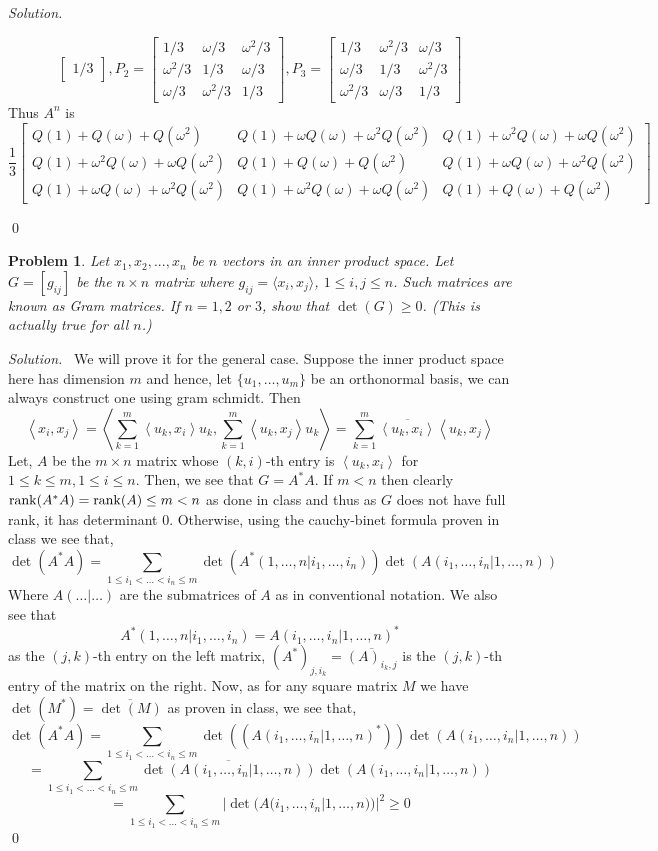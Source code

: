 \documentclass[12pt,a4paper]{article}
\newenvironment{solution}{%
  \par\noindent\textit{Solution.}\ }{\qed}
\theoremstyle{problemstyle}
\newtheorem{problem}{Problem}[section]
\def\w{\omega}
\newcommand{\ipp}[1]{{\left\langle{#1}\right\rangle}}
\begin{document}
\begin{solution}
\begin{enumerate}[\label=(\roman*)]
$$\begin{bmatrix}
1/3\end{bmatrix},P_2=\begin{bmatrix}1/3 & \w/3 & \w^2/3\\ \w^2/3 & 1/3 &
\w/3\\ \w/3 & \w^2/3 & 1/3\end{bmatrix}, P_3=\begin{bmatrix}1/3 & \omega^2/3 & \omega/3\\ \w/3 & 1/3 & \w^2/3\\ \w^2/3 & \w/3 & 1/3\end{bmatrix}$$
Thus $A^n$ is
$$
\frac{1}{3}
\begin{bmatrix}
Q(1) + Q(\w) + Q(\w^2) & Q(1) + \w Q(\w) + \w^2 Q(\w^2) & Q(1) + \w^2 Q(\w) + \w Q(\w^2) \\
Q(1) + \w^2 Q(\w) + \w Q(\w^2) & Q(1) + Q(\w) + Q(\w^2) & Q(1) + \w Q(\w) + \w^2 Q(\w^2) \\
Q(1) + \w Q(\w) + \w^2 Q(\w^2) & Q(1) + \w^2 Q(\w) + \w Q(\w^2) & Q(1) + Q(\w) + Q(\w^2)
\end{bmatrix}
$$
\end{enumerate}
\end{solution}
\begin{problem}\label{prob:2-4}
Let $x_{1},x_{2},...,x_{n}$ be $n$ vectors in an inner product space. Let $G=[g_{ij}]$ be the $n\times n$ matrix where $g_{ij}=\langle x_{i},x_{j}\rangle$, $1 \le i, j \le n$. Such matrices are known as Gram matrices. If $n=1, 2$ or $3$, show that $\det(G)\ge0$. (This is actually true for all $n$.)
\end{problem}
\begin{solution}
We will prove it for the general case. Suppose the inner product space here has dimension $m$ and hence, let $\{u_1,\ldots,u_m\}$ be an orthonormal basis, we can always construct one using gram schmidt. Then
$$\ipp{x_i,x_j}=\ipp{\sum_{k=1}^m\ipp{u_k,x_i}u_k,\sum_{k=1}^m\ipp{u_k,x_j}u_k}=\sum_{k=1}^m\overline{\ipp{u_k,x_i}}\ipp{u_k,x_j}$$
Let, $A$ be the $m\times n$ matrix whose $(k,i)$-th entry is $\ipp{u_k,x_i}$ for $1\leq k\leq m,1\leq i\leq n.$ Then, we see that $G=A^*A$. If $m<n$ then clearly $\rank (A^*A)=\rank(A)\leq m<n$ as done in class and thus as $G$ does not have full rank, it has determinant $0$. Otherwise, using the cauchy-binet formula proven in class we see that,
$$\det(A^*A)=\sum_{1\leq i_1<\ldots<i_n\leq m}\det(A^*(1,\ldots,n|i_1,\ldots,i_n))\det(A(i_1,\ldots,i_n|1,\ldots,n))$$
Where $A(\ldots|\ldots)$ are the submatrices of $A$ as in conventional notation. We also see that 
$$A^*(1,\ldots,n|i_1,\ldots,i_n)=A(i_1,\ldots,i_n|1,\ldots,n)^*$$
as the $(j,k)$-th entry on the left matrix, $(A^*)_{j,i_k}=\overline{(A)_{i_k,j}}$ is the $(j,k)$-th entry of the matrix on the right. Now, as for any square matrix $M$ we have $\det(M^*)=\overline{\det(M)}$ as proven in class, we see that,
$$\det(A^*A)=\sum_{1\leq i_1<\ldots<i_n\leq m}\det((A(i_1,\ldots,i_n|1,\ldots,n)^*))\det(A(i_1,\ldots,i_n|1,\ldots,n))$$
$$=\sum_{1\leq i_1<\ldots<i_n\leq m}\overline{\det(A(i_1,\ldots,i_n|1,\ldots,n))}\det(A(i_1,\ldots,i_n|1,\ldots,n))$$
$$=\sum_{1\leq i_1<\ldots<i_n\leq m}|\det(A(i_1,\ldots,i_n|1,\ldots,n))|^2\geq 0$$
\end{solution}
\end{document}
